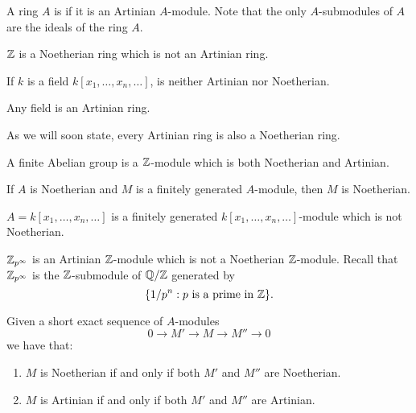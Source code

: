 \documentclass{ximera}
\begin{document}
\begin{definition} A ring $A$ is  if it is an Artinian $A$-module. Note that the only $A$-submodules of $A$ are the ideals of the ring $A$.
\end{definition}

\begin{example} $\mathbb Z$ is a Noetherian ring which is not an Artinian ring.
\end{example}

\begin{example} If $k$ is a field $k[x_1,\dots,x_n,\dots]$,  is neither Artinian nor Noetherian. 
\end{example}

\begin{example} Any field is an Artinian ring. 
\end{example}

\begin{remark} As we will soon state, every Artinian ring is also a Noetherian ring. 
\end{remark}



\begin{example} A finite Abelian group is a $\mathbb Z$-module which is both Noetherian and Artinian.
\end{example}



\begin{proposition} If $A$ is Noetherian and $M$ is a finitely generated $A$-module, then $M$ is Noetherian.
\end{proposition}


\begin{example} $A=k[x_1,\dots,x_n,\dots]$ is a finitely generated $k[x_1,\dots,x_n,\dots]$-module which is not Noetherian.
\end{example}

\begin{example} $\mathbb Z_{p^\infty}$ is an Artinian $\mathbb Z$-module which is not a Noetherian $\mathbb Z$-module. Recall that $\mathbb Z_{p^\infty}$ is the $\mathbb Z$-submodule of $\mathbb Q/\mathbb Z$ generated by
\[
\{1/p^n : p\text{ is a prime in } \mathbb Z\}.
\]
\end{example}





\begin{proposition}  Given a short exact sequence of $A$-modules
\[
0\to M' \to M\to M'' \to 0
\]
we have that:
\begin{enumerate}
\item $M$ is Noetherian if and only if both $M'$ and $M''$ are Noetherian.
\item $M$ is Artinian if and only if both $M'$ and $M''$ are Artinian.
\end{enumerate}
\end{proposition}
\end{document}
